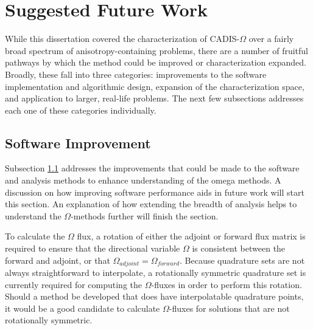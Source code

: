 \section{Suggested Future Work}
\label{sec:futurewrk}

While this dissertation covered the characterization of CADIS-$\Omega$ over a
fairly broad spectrum of anisotropy-containing problems, there are a number of
fruitful pathways by which the method could be improved or characterization
expanded. Broadly, these fall into three categories: improvements to the
software implementation and algorithmic design, expansion of the
characterization space, and application to larger, real-life problems.
The next few
subsections addresses each one of these categories individually.

\subsection{Software Improvement}
\label{subsec:softwareimp}

Subsection \ref{subsec:softwareimp} addresses the improvements that could be
made to the software and analysis methods to enhance understanding of the omega
methods. A discussion on how improving software performance aids in
future work will start this section.
An explanation of how extending the breadth of analysis
helps to understand the $\Omega$-methods further will finish the section.

To calculate the $\Omega$ flux, a rotation of either the adjoint or forward
flux matrix is
required to ensure that the directional variable $\Omega$ is consistent between
the forward and adjoint,
or that $\Omega_{adjoint} = \Omega_{forward}$. Because quadrature sets
are not always straightforward to interpolate, a rotationally symmetric
quadrature set is currently required for computing the $\Omega$-fluxes in order
to perform this rotation.
Should a method
be developed that does have interpolatable quadrature points, it would be a good
candidate to calculate $\Omega$-fluxes for solutions that are not
rotationally symmetric.

